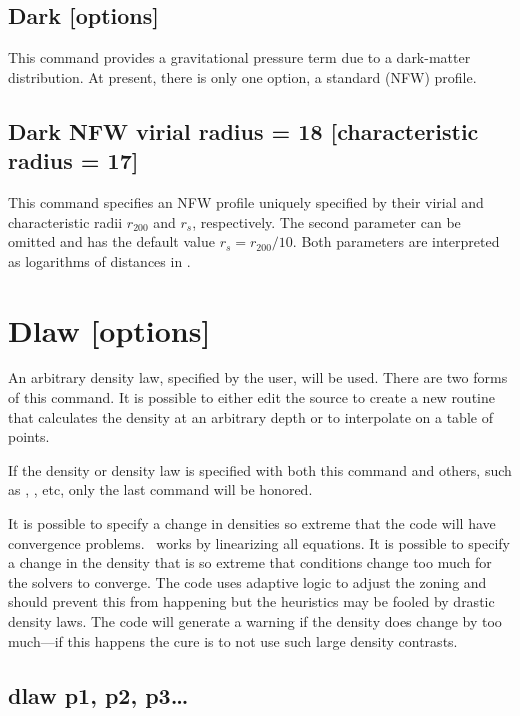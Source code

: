 \begin{shaded}
\section{\experimental Dark [options]}
This command provides a gravitational pressure term due to a dark-matter
distribution.  At present, there is only one option, a standard
\citet{NFW96} (NFW) profile.

\subsection{Dark NFW virial radius = 18 [characteristic radius = 17]}
This command specifies an NFW profile uniquely specified by their 
virial and characteristic radii $r_{200}$ and $r_s$, respectively.
The second parameter can be omitted and has the
default value $r_s=r_{200}/10.$ Both parameters are interpreted as 
logarithms of distances in \cm.
\end{shaded}

\section{Dlaw [options]}

An arbitrary density law, specified by the user, will be used.
There are two forms of this command.
It is possible to either edit the source
to create a new routine that calculates the density at an arbitrary depth
or to interpolate on a table of points.

If the density or density law is specified with both this command and
others, such as , , etc,
only the last command will be honored.

It is possible to specify a change in densities so extreme that the code
will have convergence problems.
\Cloudy\ works by linearizing all equations.
It is possible to specify a change in the density that is so extreme that
conditions change too much for the solvers to converge.  The code uses
adaptive logic to adjust the zoning and should prevent this from happening
but the heuristics may be fooled by drastic density laws.  The code will
generate a warning if the density does change by too much---if
this happens
the cure is to not use such large density contrasts.

\subsection{dlaw p1, p2, p3\dots}

